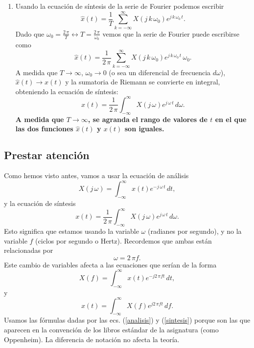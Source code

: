 \begin{enumerate}
	\item Usando la ecuación de síntesis de la serie de Fourier podemos escribir 
	\begin{equation}
		\hat{x}(t) = \frac{1}{T} \sum_{k=-\infty}^{\infty} X(j \, k \, \omega_{0}) e^{j \, k \, \omega_{0} \, t}.
	\end{equation}
	Dado que $\omega_{0} = \frac{2 \, \pi}{T} \longleftrightarrow T = \frac{2 \, \pi}{\omega_{0}}$ vemos que la serie de Fourier puede escribirse como
	\begin{equation}
		\hat{x}(t) = \frac{1}{2 \, \pi} \sum_{k=-\infty}^{\infty} X(j \, k \, \omega_{0}) e^{j \, k \, \omega_{0} \, t} \, \omega_{0}.
	\end{equation}
	A medida que $T \rightarrow \infty$, $\omega_{0} \rightarrow 0$ (o sea un diferencial de frecuencia $d\omega$), $\hat{x}(t) \rightarrow x(t)$ y la sumatoria de Riemann se convierte en integral, obteniendo la ecuación de síntesis:
	\begin{equation}
		x(t) = \frac{1}{2 \, \pi} \int_{-\infty}^{\infty} X(j \, \omega) e^{j \, \omega \, t} \, d\omega .
	\end{equation}
	\textbf{A medida que $T \rightarrow \infty$, se agranda el rango de valores de $t$ en el que las dos funciones $\hat{x}(t)$ y $x(t)$ son iguales.}
\end{enumerate}

\subsection{Prestar atención}

Como hemos visto antes, vamos a usar la ecuación de análisis 
\begin{equation}
	X(j \, \omega) = \int_{-\infty}^{\infty} x(t) e^{-j \, \omega \, t} \, dt,  \label{analisis}
\end{equation}
y la ecuación de síntesis 
\begin{equation}
	x(t) = \frac{1}{2 \, \pi} \int_{-\infty}^{\infty} X(j \, \omega) e^{j \, \omega \, t} \, d\omega . \label{sintesis}
\end{equation}
Esto significa que estamos usando la variable $\omega$ (radianes por segundo), y no la variable $f$ (ciclos por segundo o Hertz). Recordemos que ambas están relacionadas por 
\begin{equation}
	\omega = 2 \, \pi f.
\end{equation}
Este cambio de variables afecta a las ecuaciones que serían de la forma 
\begin{equation}
	X(f) = \int_{-\infty}^{\infty} x(t) e^{-j 2 \, \pi f t} \, dt,
\end{equation}
y 
\begin{equation}
	x(t) = \int_{-\infty}^{\infty} X(f) e^{j 2 \, \pi f t} \, df.
\end{equation}
Usamos las fórmulas dadas por las ecs. (\ref{analisis}) y (\ref{sintesis}) porque son las que aparecen en la convención de los libros estándar de la asignatura (como Oppenheim). La diferencia de notación no afecta la teoría.

